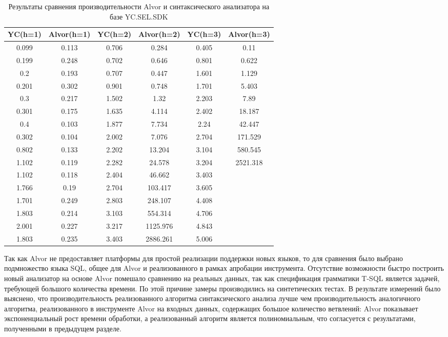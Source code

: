 \begin{table} [htbp]
  \centering
  \parbox{14cm}{\caption{Результаты сравнения производительности Alvor и синтаксического анализатора на базе YC.SEL.SDK}\label{tbl:YCvsAlvor}}
  \begin{tabular}{| c | c | c | c | c | c |}
  \hline                               
  \hline
  YC(h=1) & Alvor(h=1) & YC(h=2) & Alvor(h=2) & YC(h=3) & Alvor(h=3)\\
  \hline 
0.099 &  0.113 &  0.706 &  0.284   & 0.405 &  0.11     \\
0.199 &  0.248 &  0.702 &  0.646   & 0.801 &  0.622    \\
0.2   &  0.193 &  0.707 &  0.447   & 1.601 &  1.129    \\
0.201 &  0.302 &  0.901 &  0.748   & 1.701 &  5.403    \\
0.3   &  0.217 &  1.502 &  1.32    & 2.203 &  7.89     \\
0.301 &  0.175 &  1.635 &  4.114   & 2.402 &  18.187   \\
0.4   &  0.103 &  1.877 &  7.734   & 2.24  &  42.447   \\
0.302 &  0.104 &  2.002 &  7.076   & 2.704 &  171.529  \\
0.802 &  0.133 &  2.202 &  13.204  & 3.104 &  580.545  \\
1.102 &  0.119 &  2.282 &  24.578  & 3.204 &  2521.318 \\
1.102 &  0.118 &  2.404 &  46.662  & 3.403 &           \\
1.766 &  0.19  &  2.704 &  103.417 & 3.605 &           \\
1.701 &  0.249 &  2.803 &  248.107 & 4.408 &           \\
1.803 &  0.214 &  3.103 &  554.314 & 4.706 &           \\
2.001 &  0.227 &  3.217 &  1125.976& 4.843 &           \\
1.803 &  0.235 &  3.403 &  2886.261& 5.006 &           \\
  \hline
  \hline

  \end{tabular}
\end{table}

Так как Alvor не предоставляет платформы для простой реализации поддержки новых языков, то для сравнения было выбрано подмножество языка SQL, общее для Alvor и реализованного в рамках апробации инструмента. Отсутствие возможности быстро построить новый анализатор на основе Alvor помешало сравнению на реальных данных, так как спецификация грамматики T-SQL является задачей, требующей большого количества времени. По этой причине замеры производились на синтетических тестах. В результате измерений было выяснено, что производительность реализованного алгоритма синтаксического анализа лучше чем производительность аналогичного алгоритма, реализованного в инструменте Alvor на входных данных, содержащих большое количество ветвлений: Alvor показывает экспоненциальный рост времени обработки, а реализованный алгоритм является полиномиальным, что согласуется с результатами, полученными в предыдущем разделе.

